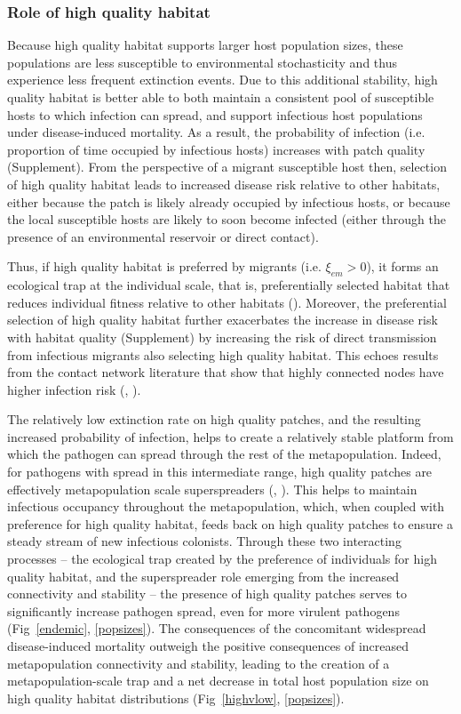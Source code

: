 \documentclass{article}
\begin{document}
\subsubsection*{Role of high quality habitat}

Because high quality habitat supports larger host population sizes, these populations are less susceptible to environmental stochasticity and thus experience less frequent extinction events.
Due to this additional stability, high quality habitat is better able to both maintain a consistent pool of susceptible hosts to which infection can spread, and support infectious host populations under disease-induced mortality. 
As a result, the probability of infection (i.e. proportion of time occupied by infectious hosts) increases with patch quality (Supplement).
From the perspective of a migrant susceptible host then, selection of high quality habitat leads to increased disease risk relative to other habitats, either because the patch is likely already occupied by infectious hosts, or because the local susceptible hosts are likely to soon become infected (either through the presence of an environmental reservoir or direct contact).

Thus, if high quality habitat is preferred by migrants (i.e. $\xi_{em} > 0$), it forms an ecological trap at the individual scale, that is, preferentially selected habitat that reduces individual fitness relative to other habitats (\cite{Robertson2006}).
Moreover, the preferential selection of high quality habitat further exacerbates the increase in disease risk with habitat quality (Supplement) by increasing the risk of direct transmission from infectious migrants also selecting high quality habitat.
This echoes results from the contact network literature that show that highly connected nodes have higher infection risk (\cite{Christley2005}, \cite{Keeling2005}).

The relatively low extinction rate on high quality patches, and the resulting increased probability of infection, helps to create a relatively stable platform from which the pathogen can spread through the rest of the metapopulation.
Indeed, for pathogens with spread in this intermediate range, high quality patches are effectively metapopulation scale superspreaders (\cite{Lloyd-Smith2005}, \cite{Paull2012}).  
This helps to maintain infectious occupancy throughout the metapopulation, which, when coupled with preference for high quality habitat, feeds back on high quality patches to ensure a steady stream of new infectious colonists. 
Through these two interacting processes -- the ecological trap created by the preference of individuals for high quality habitat, and the superspreader role emerging from the increased connectivity and stability -- the presence of high quality patches serves to significantly increase pathogen spread, even for more virulent pathogens (Fig~\ref{endemic}, \ref{popsizes}).
The consequences of the concomitant widespread disease-induced mortality outweigh the positive consequences of increased metapopulation connectivity and stability, leading to the creation of a metapopulation-scale trap and a net decrease in total host population size on high quality habitat distributions (Fig~\ref{highvlow}, \ref{popsizes}).  
\end{document}
